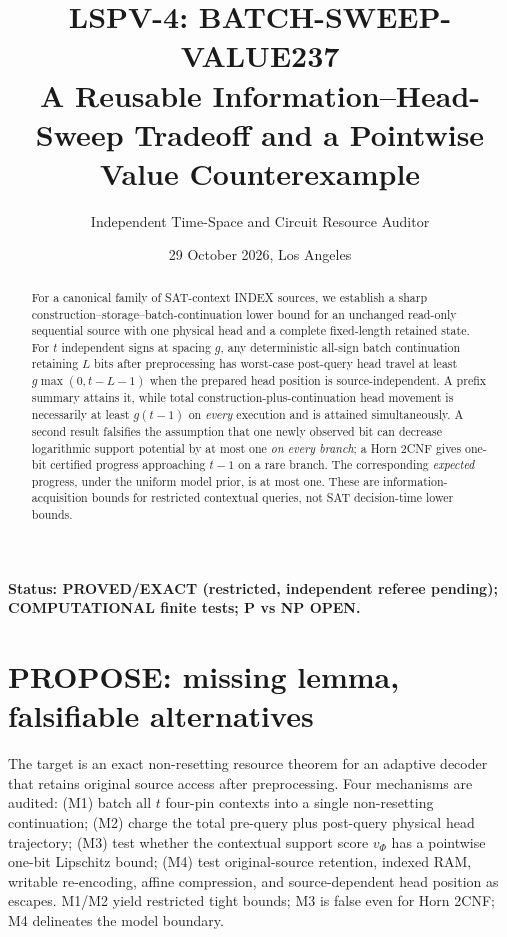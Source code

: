 \documentclass[10pt]{article}
\title{LSPV-4: BATCH-SWEEP-VALUE237\\A Reusable Information--Head-Sweep Tradeoff and a Pointwise Value Counterexample}
\author{Independent Time-Space and Circuit Resource Auditor}
\date{29 October 2026, Los Angeles}
\begin{document}
\maketitle
\noindent\textbf{Status: PROVED/EXACT (restricted, independent referee pending); COMPUTATIONAL finite tests; P vs NP OPEN.}
\begin{abstract}
For a canonical family of SAT-context INDEX sources, we establish a sharp construction--storage--batch-continuation lower bound for an unchanged read-only sequential source with one physical head and a complete fixed-length retained state. For $t$ independent signs at spacing $g$, any deterministic all-sign batch continuation retaining $L$ bits after preprocessing has worst-case post-query head travel at least $g\max(0,t-L-1)$ when the prepared head position is source-independent. A prefix summary attains it, while total construction-plus-continuation head movement is necessarily at least $g(t-1)$ on \emph{every} execution and is attained simultaneously. A second result falsifies the assumption that one newly observed bit can decrease logarithmic support potential by at most one \emph{on every branch}; a Horn 2CNF gives one-bit certified progress approaching $t-1$ on a rare branch. The corresponding \emph{expected} progress, under the uniform model prior, is at most one. These are information-acquisition bounds for restricted contextual queries, not SAT decision-time lower bounds.
\end{abstract}

\section{PROPOSE: missing lemma, falsifiable alternatives}
The target is an exact non-resetting resource theorem for an adaptive decoder that retains original source access after preprocessing. Four mechanisms are audited: (M1) batch all $t$ four-pin contexts into a single non-resetting continuation; (M2) charge the total pre-query plus post-query physical head trajectory; (M3) test whether the contextual support score $v_\Phi$ has a pointwise one-bit Lipschitz bound; (M4) test original-source retention, indexed RAM, writable re-encoding, affine compression, and source-dependent head position as escapes. M1/M2 yield restricted tight bounds; M3 is false even for Horn 2CNF; M4 delineates the model boundary.
\end{document}
